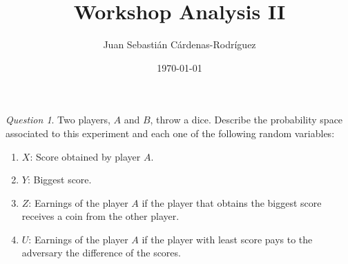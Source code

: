 \documentclass[11pt]{article}
\title{Workshop Analysis II}
\author{Juan Sebasti\'an C\'ardenas-Rodríguez \\
  \scalebox{0.7}{Mathematical Engineering, Universidad EAFIT}}
\date{\today}
\theoremstyle{definition}
\theoremstyle{remark}
\theoremstyle{remark}
\newtheorem{question}{Question}
\begin{document}
\maketitle
\begin{question}
  Two players, $A$ and $B$, throw a dice. Describe the probability
  space associated to this experiment and each one of the following
  random variables:
  \begin{enumerate}[label=\alph*)]
  \item $X$: Score obtained by player $A$.
  \item $Y$: Biggest score.
  \item $Z$: Earnings of the player $A$ if the player that obtains the
    biggest score receives a coin from the other player.
  \item $U$: Earnings of the player $A$ if the player with least score
    pays to the adversary the difference of the scores.
  \end{enumerate}
\end{question}
\end{document}
